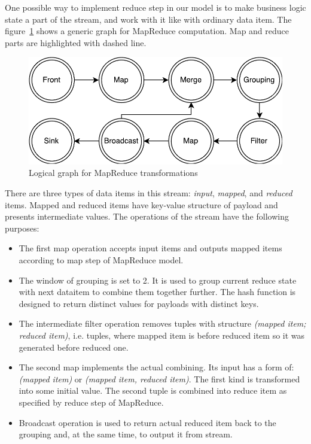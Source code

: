 One possible way to implement reduce step in our model is to make business logic state a part of the stream, and work with it like with ordinary data item. The figure~\ref{mapreduce-graph-figure} shows a generic graph for MapReduce computation. Map and reduce parts are highlighted with dashed line.

\begin{figure}[htb]
  \centering
  \includegraphics[scale=0.5]{pics/mapreduce}
  \caption{Logical graph for MapReduce transformations}
  \label {mapreduce-graph-figure}
\end{figure}

There are three types of data items in this stream: {\it input}, {\it mapped}, and {\it reduced} items. Mapped and reduced items have key-value structure of payload and presents intermediate values. The operations of the stream have the following purposes:

\begin{itemize}
\item The first map operation accepts input items and outputs mapped items according to map step of MapReduce model.
\item The window of grouping is set to 2. It is used to group current reduce state with next dataitem to combine them together further. The hash function is designed to return distinct values for payloads with distinct keys.
\item The intermediate filter operation removes tuples with structure \textit{(mapped item; reduced item)}, i.e. tuples, where mapped item is before reduced item so it was generated before reduced one.
\item The second map implements the actual combining. Its input has a form of: \textit{(mapped item)} or \textit{(mapped item, reduced item)}. The first kind is transformed into some initial value. The second tuple is combined into reduce item as specified by reduce step of MapReduce. 
\item Broadcast operation is used to return actual reduced item back to the grouping and, at the same time, to output it from stream. 
\end{itemize}

